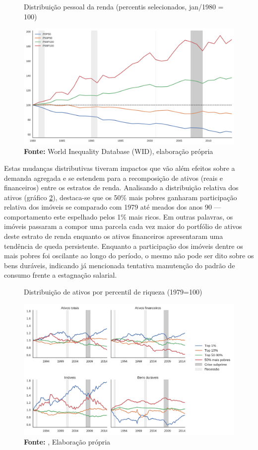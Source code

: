 \begin{figure}[H]
	\centering
	\caption{Distribuição pessoal da renda (percentis selecionados, jan/1980 = 100)}
	\label{FigDistPessoal}
	\includegraphics[width=\textwidth]{../../Dados/Fatos_Estilizados/figs/Dist_Pessoal.png}
	\caption*{\textbf{Fonte:} World Inequality Database (WID), elaboração própria}
\end{figure}


Estas mudanças distributivas tiveram impactos que vão além efeitos sobre a demanda agregada e se estendem para a recomposição de ativos (reais e financeiros) entre os estratos de renda.
Analisando a distribuição relativa dos ativos (gráfico \ref{FigDistAtivos}), destaca-se que os 50\% mais pobres ganharam participação relativa dos imóveis se comparado com 1979 até meados dos anos 90 ---  comportamento este espelhado pelos 1\% mais ricos. 
Em outras palavras, os imóveis passaram a compor uma parcela cada vez maior do portfólio de ativos deste estrato de renda enquanto os ativos financeiros apresentaram uma tendência de queda persistente.
Enquanto a participação dos imóveis dentre os mais pobres foi oscilante ao longo do período, o mesmo não pode ser dito sobre os bens duráveis, indicando já mencionada tentativa manutenção do padrão de consumo frente a estagnação salarial.


\begin{figure}[H]
	\centering
	\caption{Distribuição de ativos por percentil de riqueza (1979=100)}
	\label{FigDistAtivos}
	\includegraphics[width=\textwidth]{../../Dados/Fatos_Estilizados/figs/Distribuicao_Ativos.png}
	\caption*{\textbf{Fonte:} \textcite{us_census_bureau_characteristics_2017}, Elaboração própria}
\end{figure}

